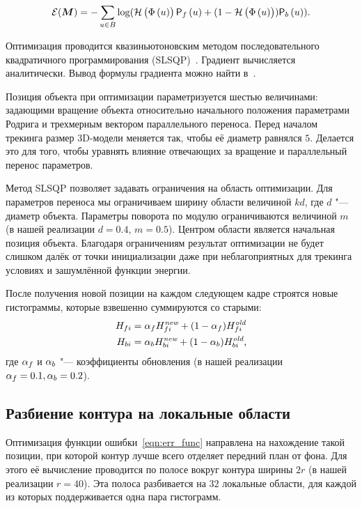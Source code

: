 \begin{equation}\label{eqn:err_func}
    \mathcal{E}(\bm{M}) = - \sum\limits_{\mathnormal{u} \in B}
        \log(\mathcal{H} \left( \Phi \left( \mathnormal{u} \right) \right) \mathsf{P}_f \left( \mathnormal{u} \right) + (1 - \mathcal{H} \left( \Phi \left( \mathnormal{u} \right) \right))\mathsf{P}_b \left( \mathnormal{u} \right))
\text{.}
\end{equation}

Оптимизация проводится квазиньютоновским методом последовательного
квадратичного программирования (SLSQP)~\cite{SLSQP}.
Градиент вычисляется аналитически.
Вывод формулы градиента можно найти в~\cite{Tjaden2018}.

Позиция объекта при оптимизации параметризуется шестью величинами:
задающими вращение объекта относительно начального положения параметрами Родрига
и трехмерным вектором параллельного переноса.
Перед началом трекинга размер 3D-модели меняется так, чтобы её диаметр равнялся
$5$.
Делается это для того, чтобы уравнять влияние отвечающих за вращение и
параллельный перенос параметров.

Метод SLSQP позволяет задавать ограничения на область оптимизации.
Для параметров переноса мы ограничиваем ширину области величиной $kd$,
где $d$ "--- диаметр объекта.
Параметры поворота по модулю ограничиваются величиной $m$ (в нашей реализации $d
=0.4$, $m = 0.5$).
Центром области является начальная позиция объекта.
Благодаря ограничениям результат оптимизации не будет слишком далёк от точки
инициализации даже при неблагоприятных для трекинга условиях и зашумлённой
функции энергии.

После получения новой позиции на каждом следующем кадре строятся новые
гистограммы, которые взвешенно суммируются со старыми:
\begin{align}
    H_{fi} &= \alpha_{f} H_{fi}^{\text{\it new}} + (1 - \alpha_{f})
        H_{fi}^{\text{\it old}} \\
    H_{bi} &= \alpha_{b} H_{bi}^{\text{\it new}} + (1 - \alpha_{b})
        H_{bi}^{\text{\it old}}
\text{,}
\end{align}
где $\alpha_{f}$ и $\alpha_{b}$ "--- коэффициенты обновления (в нашей реализации
$\alpha_{f} = 0.1, \alpha_{b} = 0.2$).

\subsection{Разбиение контура на локальные области}\label{local-areas}

Оптимизация функции ошибки~\ref{eqn:err_func} направлена на нахождение такой
позиции, при которой контур лучше всего отделяет передний план от фона.
Для этого её вычисление проводится по полосе вокруг контура ширины $2r$ (в нашей
реализации $r = 40$).
Эта полоса разбивается на $32$ локальные области, для каждой из
которых поддерживается одна пара гистограмм.

